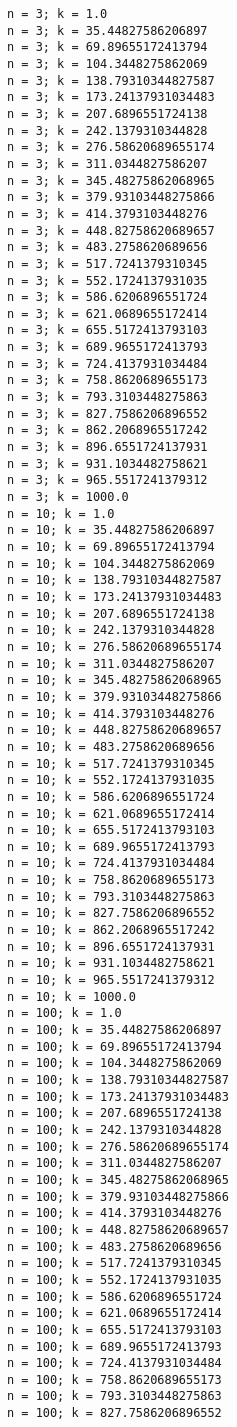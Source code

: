 \documentclass{article}
\begin{document}
    \begin{Verbatim}[commandchars=\\\{\}]
n = 3; k = 1.0
n = 3; k = 35.44827586206897
n = 3; k = 69.89655172413794
n = 3; k = 104.3448275862069
n = 3; k = 138.79310344827587
n = 3; k = 173.24137931034483
n = 3; k = 207.6896551724138
n = 3; k = 242.1379310344828
n = 3; k = 276.58620689655174
n = 3; k = 311.0344827586207
n = 3; k = 345.48275862068965
n = 3; k = 379.93103448275866
n = 3; k = 414.3793103448276
n = 3; k = 448.82758620689657
n = 3; k = 483.2758620689656
n = 3; k = 517.7241379310345
n = 3; k = 552.1724137931035
n = 3; k = 586.6206896551724
n = 3; k = 621.0689655172414
n = 3; k = 655.5172413793103
n = 3; k = 689.9655172413793
n = 3; k = 724.4137931034484
n = 3; k = 758.8620689655173
n = 3; k = 793.3103448275863
n = 3; k = 827.7586206896552
n = 3; k = 862.2068965517242
n = 3; k = 896.6551724137931
n = 3; k = 931.1034482758621
n = 3; k = 965.5517241379312
n = 3; k = 1000.0
n = 10; k = 1.0
n = 10; k = 35.44827586206897
n = 10; k = 69.89655172413794
n = 10; k = 104.3448275862069
n = 10; k = 138.79310344827587
n = 10; k = 173.24137931034483
n = 10; k = 207.6896551724138
n = 10; k = 242.1379310344828
n = 10; k = 276.58620689655174
n = 10; k = 311.0344827586207
n = 10; k = 345.48275862068965
n = 10; k = 379.93103448275866
n = 10; k = 414.3793103448276
n = 10; k = 448.82758620689657
n = 10; k = 483.2758620689656
n = 10; k = 517.7241379310345
n = 10; k = 552.1724137931035
n = 10; k = 586.6206896551724
n = 10; k = 621.0689655172414
n = 10; k = 655.5172413793103
n = 10; k = 689.9655172413793
n = 10; k = 724.4137931034484
n = 10; k = 758.8620689655173
n = 10; k = 793.3103448275863
n = 10; k = 827.7586206896552
n = 10; k = 862.2068965517242
n = 10; k = 896.6551724137931
n = 10; k = 931.1034482758621
n = 10; k = 965.5517241379312
n = 10; k = 1000.0
n = 100; k = 1.0
n = 100; k = 35.44827586206897
n = 100; k = 69.89655172413794
n = 100; k = 104.3448275862069
n = 100; k = 138.79310344827587
n = 100; k = 173.24137931034483
n = 100; k = 207.6896551724138
n = 100; k = 242.1379310344828
n = 100; k = 276.58620689655174
n = 100; k = 311.0344827586207
n = 100; k = 345.48275862068965
n = 100; k = 379.93103448275866
n = 100; k = 414.3793103448276
n = 100; k = 448.82758620689657
n = 100; k = 483.2758620689656
n = 100; k = 517.7241379310345
n = 100; k = 552.1724137931035
n = 100; k = 586.6206896551724
n = 100; k = 621.0689655172414
n = 100; k = 655.5172413793103
n = 100; k = 689.9655172413793
n = 100; k = 724.4137931034484
n = 100; k = 758.8620689655173
n = 100; k = 793.3103448275863
n = 100; k = 827.7586206896552

\end{Verbatim}
\end{document}
